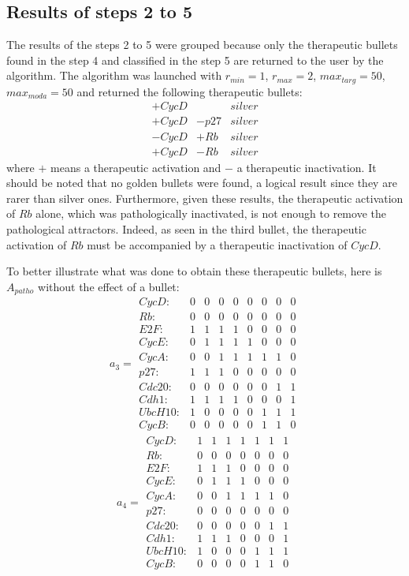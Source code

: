 \documentclass[oneside,a4paper,onecolumn,notitlepage]{article}
\begin{document}
\subsection*{Results of steps 2 to 5}
The results of the steps 2 to 5 were grouped because only the therapeutic bullets found in the step 4 and classified in the step 5 are returned to the user by the algorithm. The algorithm was launched with $r_{min}=1$, $r_{max}=2$, $max_{targ}=50$, $max_{moda}=50$ and returned the following therapeutic bullets:
\begin{equation*}
\begin{matrix}
+CycD&&silver\\
+CycD&-p27&silver\\
-CycD&+Rb&silver\\
+CycD&-Rb&silver
\end{matrix}
\end{equation*}
where $+$ means a therapeutic activation and $-$ a therapeutic inactivation. It should be noted that no golden bullets were found, a logical result since they are rarer than silver ones. Furthermore, given these results, the therapeutic activation of $Rb$ alone, which was pathologically inactivated, is not enough to remove the pathological attractors. Indeed, as seen in the third bullet, the therapeutic activation of $Rb$ must be accompanied by a therapeutic inactivation of $CycD$.

To better illustrate what was done to obtain these therapeutic bullets, here is $A_{patho}$ without the effect of a bullet:
\begin{equation*}
a_{3}=
\begin{matrix}
CycD:&0&0&0&0&0&0&0&0\\
Rb:&0&0&0&0&0&0&0&0\\
E2F:&1&1&1&1&0&0&0&0\\
CycE:&0&1&1&1&1&0&0&0\\
CycA:&0&0&1&1&1&1&1&0\\
p27:&1&1&1&0&0&0&0&0\\
Cdc20:&0&0&0&0&0&0&1&1\\
Cdh1:&1&1&1&1&0&0&0&1\\
UbcH10:&1&0&0&0&0&1&1&1\\
CycB:&0&0&0&0&0&1&1&0
\end{matrix}
\end{equation*}
\begin{equation*}
a_{4}=
\begin{matrix}
CycD:&1&1&1&1&1&1&1\\
Rb:&0&0&0&0&0&0&0\\
E2F:&1&1&1&0&0&0&0\\
CycE:&0&1&1&1&0&0&0\\
CycA:&0&0&1&1&1&1&0\\
p27:&0&0&0&0&0&0&0\\
Cdc20:&0&0&0&0&0&1&1\\
Cdh1:&1&1&1&0&0&0&1\\
UbcH10:&1&0&0&0&1&1&1\\
CycB:&0&0&0&0&1&1&0
\end{matrix}
\end{equation*}
\end{document}

